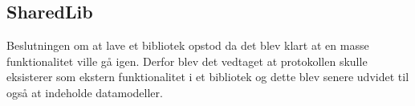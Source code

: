 \subsection{SharedLib}
Beslutningen om at lave et bibliotek opstod da det blev klart at en masse funktionalitet ville gå igen. Derfor blev det vedtaget at protokollen skulle eksisterer som ekstern funktionalitet i et bibliotek og dette blev senere udvidet til også at indeholde datamodeller.



